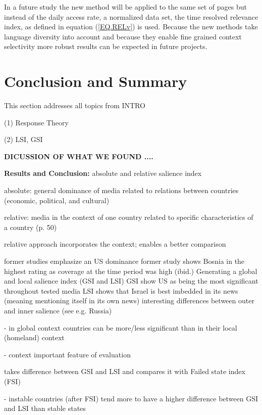 \documentclass[a4paper,10pt]{scrbook}
\begin{document}
In a future study the new method will be applied to the same set of pages but instead of the daily access rate, a normalized data set, the time resolved relevance index, as defined in equation (\ref{EQ.RELv}) is used. Because the new methods take language diversity into account and because they enable fine grained context selectivity more robust results can be expected in future projects. 



%
%
%
%


\chapter{Conclusion and Summary}
This section addresses all topics from INTRO

(1) Response Theory

(2) LSI, GSI


\textbf{DICUSSION OF WHAT WE FOUND ....}

\textbf{Results and Conclusion: }
absolute and relative salience index

absolute:  general dominance of media
related to relations between countries (economic, political, and cultural)

relative:
media in the context of one country
related to specific characteristics of a country (p. 50)

relative approach incorporates the context; enables a better comparison

former studies emphasize an US dominance 
former study shows Bosnia in the highest rating as coverage at the time period was high (ibid.)
Generating a global and local salience index (GSI and LSI)
GSI show US as being the most significant throughout tested media
LSI shows that Israel is best imbedded in its news (meaning mentioning itself in its own news) 
interesting differences between outer and inner salience (see e.g. Russia)


- in global context countries can be more/less significant than in their local (homeland) context

- context important feature of evaluation

takes difference between GSI and LSI and compares it with Failed state index (FSI)

- instable countries (after FSI) tend more to have a higher difference between GSI and LSI than stable states
\end{document}
